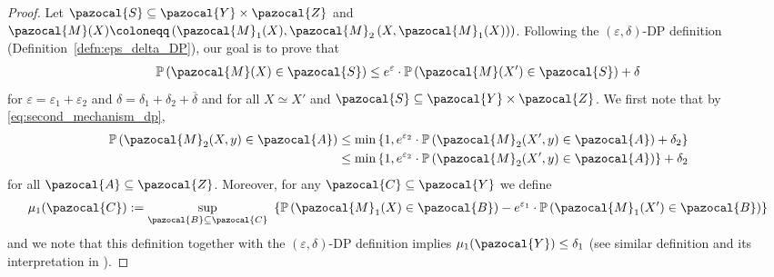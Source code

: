 \documentclass[11pt]{article}
\theoremstyle{definition}
\theoremstyle{plain}
\providecommand{\definitionref}[1]
{Definition~\ref{#1}}
\newcommand{\eps}{{\varepsilon}}
\newcommand{\pA}{\pazocal{A}}
\newcommand{\pB}{\pazocal{B}}
\newcommand{\pC}{\pazocal{C}}
\newcommand{\pM}{\pazocal{M}}
\newcommand{\pS}{\pazocal{S}}
\newcommand{\pY}{\pazocal{Y}}
\newcommand{\pZ}{\pazocal{Z}}
\renewcommand{\eps}{\varepsilon}
\begin{document}
\begin{proof}
    Let $\pS \subseteq \pY\times \pZ$ and $\pM(X) \coloneqq \left(\pM_1(X), \pM_2\left(X, \pM_1(X)\right)\right)$. Following the $(\eps,\delta)$-DP definition (\definitionref{defn:eps_delta_DP}), our goal is to prove that
    \begin{align}
        \mathbb{P}\left(\pM(X) \in \pS\right) \leq e^{\eps}\cdot \mathbb{P}\left(\pM(X') \in \pS\right) + \delta
    \end{align}
    for $\eps = \eps_1 + \eps_2$ and $\delta = \delta_1 + \delta_2 + \overline{\delta}$ and for all $X\simeq X'$ and $\pS \subseteq \pY\times \pZ$. We first note that by \eqref{eq:second_mechanism_dp}, 
    \begin{align}
        \label{eq:m2_dp_tight_bound}
        \mathbb{P}\left(\pM_2(X, y) \in \pA\right) &\leq \min\left\{1, e^{\eps_2}\cdot \mathbb{P}\left(\pM_2(X', y) \in \pA\right) + \delta_2\right\}\\
        &\leq \min\left\{1, e^{\eps_2}\cdot \mathbb{P}\left(\pM_2(X', y) \in \pA\right)\right\} + \delta_2
    \end{align}
    for all $\pA \subseteq \pZ$. Moreover, for any $\pC\subseteq\pY$ we define
    \begin{align}  
        \label{eq:mu_event_definition}
        \mu_1(\pC) := \underset{\pB\subseteq\pC}{\sup} \ \left\{\mathbb{P}\left(\pM_1(X)\in \pB\right) - e^{\eps_1}\cdot \mathbb{P}\left(\pM_1(X')\in \pB\right)\right\} 
    \end{align}
    and we note that this definition together with the $(\eps,\delta)$-DP definition implies $\mu_1(\pY) \leq \delta_1$ (see similar definition and its interpretation in \citep{balle2018privacy}). 


\end{proof}
\end{document}
